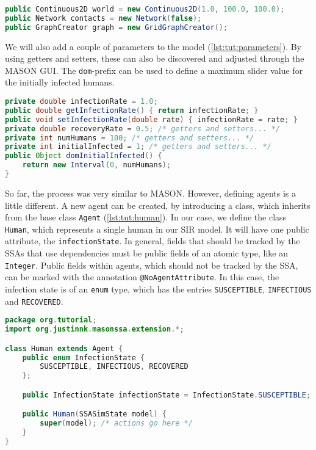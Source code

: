 \documentclass[a4paper, 12pt, bibliography=numbered]{article}
\begin{document}
\begin{lstlisting}[label=lst:tut:environment,caption={The environment for our agents.},language=Java]
public Continuous2D world = new Continuous2D(1.0, 100.0, 100.0);
public Network contacts = new Network(false);
public GraphCreator graph = new GridGraphCreator();
\end{lstlisting}

We will also add a couple of parameters to the model (\autoref{lst:tut:parameters}). By using getters and setters, these can also be discovered and adjusted through the MASON GUI. The \texttt{dom}-prefix can be used to define a maximum slider value for the initially infected humans.

\begin{lstlisting}[label=lst:tut:parameters,caption={Parameters of the model.},language=Java]
private double infectionRate = 1.0;
public double getInfectionRate() { return infectionRate; }
public void setInfectionRate(double rate) { infectionRate = rate; }
private double recoveryRate = 0.5; /* getters and setters... */
private int numHumans = 100; /* getters and setters... */
private int initialInfected = 1; /* getters and setters... */
public Object domInitialInfected() {
	return new Interval(0, numHumans);
}
\end{lstlisting}

So far, the process was very similar to MASON. However, defining agents is a little different. A new agent can be created, by introducing a class, which inherits from the base class \texttt{Agent} (\autoref{lst:tut:human}). In our case, we define the class \texttt{Human}, which represents a single human in our SIR model. It will have one public attribute, the \texttt{infectionState}. In general, fields that should be tracked by the SSAs that use dependencies must be public fields of an atomic type, like an \texttt{Integer}. Public fields within agents, which should not be tracked by the SSA, can be marked with the annotation \texttt{@NoAgentAttribute}. In this case, the infection state is of an \texttt{enum} type, which has the entries \texttt{SUSCEPTIBLE}, \texttt{INFECTIOUS} and \texttt{RECOVERED}.

\begin{lstlisting}[label=lst:tut:human,caption={The basis of our Human agent.},language=Java]
package org.tutorial;
import org.justinnk.masonssa.extension.*;

class Human extends Agent {
    public enum InfectionState {
        SUSCEPTIBLE, INFECTIOUS, RECOVERED
    };

    public InfectionState infectionState = InfectionState.SUSCEPTIBLE;

    public Human(SSASimState model) {
        super(model); /* actions go here */
    }
}
\end{lstlisting}
\end{document}
